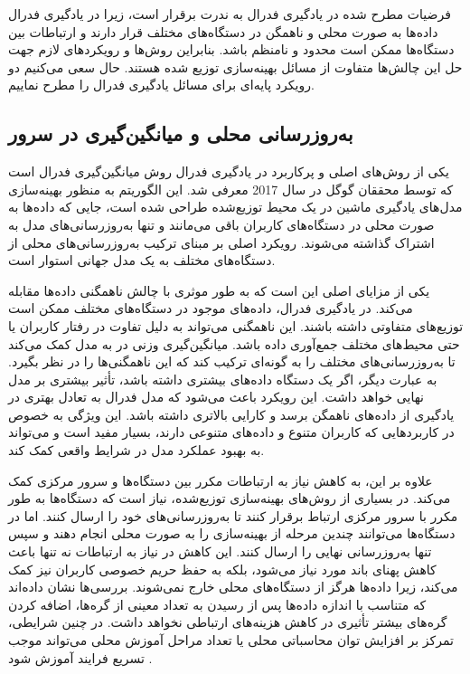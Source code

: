 فرضیات مطرح شده در یادگیری فدرال به ندرت برقرار است، زیرا در یادگیری فدرال داده‌ها به صورت محلی و ناهمگن در دستگاه‌های مختلف قرار دارند و ارتباطات بین دستگاه‌ها ممکن است محدود و نامنظم باشد. بنابراین روش‌ها و رویکردهای لازم جهت حل این چالش‌ها متفاوت از مسائل بهینه‌سازی توزیع شده هستند. حال سعی می‌کنیم دو رویکرد پایه‌ای برای مسائل یادگیری فدرال را مطرح نماییم.

\subsection{به‌روزرسانی محلی و میانگین‌گیری در سرور}
یکی از روش‌های اصلی و پرکاربرد در یادگیری فدرال روش میانگین‌گیری فدرال%
است که توسط محققان گوگل در سال 2017 معرفی شد. این الگوریتم به منظور بهینه‌سازی مدل‌های یادگیری ماشین در یک محیط توزیع‌شده طراحی شده است، جایی که داده‌ها به صورت محلی در دستگاه‌های کاربران باقی می‌مانند و تنها به‌روزرسانی‌های مدل به اشتراک گذاشته می‌شوند. رویکرد اصلی
بر مبنای ترکیب به‌روزرسانی‌های محلی از دستگاه‌های مختلف به یک مدل جهانی استوار است.

یکی از مزایای اصلی
این است که به طور موثری با چالش ناهمگنی داده‌ها مقابله می‌کند. در یادگیری فدرال، داده‌های موجود در دستگاه‌های مختلف ممکن است توزیع‌های متفاوتی داشته باشند. این ناهمگنی می‌تواند به دلیل تفاوت در رفتار کاربران یا حتی محیط‌های مختلف جمع‌آوری داده باشد. میانگین‌گیری وزنی در
به مدل کمک می‌کند تا به‌روزرسانی‌های مختلف را به گونه‌ای ترکیب کند که این ناهمگنی‌ها را در نظر بگیرد. به عبارت دیگر، اگر یک دستگاه داده‌های بیشتری داشته باشد، تأثیر بیشتری بر مدل نهایی خواهد داشت. این رویکرد باعث می‌شود که مدل فدرال به تعادل بهتری در یادگیری از داده‌های ناهمگن برسد و کارایی بالاتری داشته باشد. این ویژگی به خصوص در کاربردهایی که کاربران متنوع و داده‌های متنوعی دارند، بسیار مفید است و می‌تواند به بهبود عملکرد مدل در شرایط واقعی کمک کند.

علاوه بر این،
به کاهش نیاز به ارتباطات مکرر بین دستگاه‌ها و سرور مرکزی کمک می‌کند. در بسیاری از روش‌های بهینه‌سازی توزیع‌شده، نیاز است که دستگاه‌ها به طور مکرر با سرور مرکزی ارتباط برقرار کنند تا به‌روزرسانی‌های خود را ارسال کنند. اما در
دستگاه‌ها می‌توانند چندین مرحله از بهینه‌سازی را به صورت محلی انجام دهند و سپس تنها به‌روزرسانی نهایی را ارسال کنند. این کاهش در نیاز به ارتباطات نه تنها باعث کاهش پهنای باند مورد نیاز می‌شود، بلکه به حفظ حریم خصوصی کاربران نیز کمک می‌کند، زیرا داده‌ها هرگز از دستگاه‌های محلی خارج نمی‌شوند. بررسی‌ها نشان داده‌اند که متناسب با اندازه داده‌ها پس از رسیدن به تعداد معینی از گره‌ها، اضافه کردن گره‌های بیشتر تأثیری در کاهش هزینه‌های ارتباطی نخواهد داشت. در چنین شرایطی، تمرکز بر افزایش توان محاسباتی محلی یا تعداد مراحل آموزش محلی می‌تواند موجب تسریع فرایند آموزش شود
\cite{mcmahan2017communication}.

